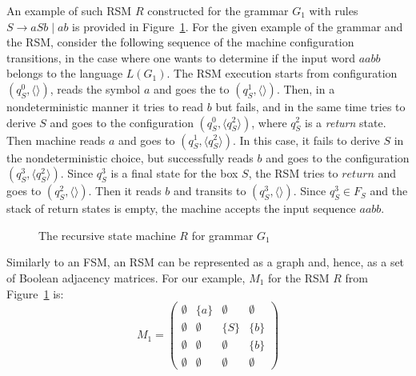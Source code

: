 An example of such RSM $R$ constructed for the grammar $G_1$ with rules $S \to a S b \mid a b$ is provided in Figure~\ref{example:automata}.
For the given example of the grammar and the RSM, consider the following sequence of the machine configuration transitions, in the case where one wants to determine if the input word $aabb$ belongs to the language $L(G_1)$.
The RSM execution starts from configuration $(q_S^0,\langle \rangle)$, reads the symbol $a$ and goes the to $(q_S^1, \langle \rangle)$.
Then, in a nondeterministic manner it tries to read $b$ but fails, and in the same time tries to derive $S$ and goes to the configuration $(q_S^0, \langle q_S^2 \rangle)$, where $q_S^2$ is a \textit{return} state.
Then machine reads $a$ and goes to $(q_S^1, \langle q_S^2 \rangle)$. In this case, it fails to derive $S$ in the nondeterministic choice, but successfully reads $b$ and goes to the configuration $(q_S^3,\langle q_S^2 \rangle)$.
Since $q_S^3$ is a final state for the box $S$, the RSM tries to $return$ and goes to $(q_S^2,\langle \rangle)$.
Then it reads $b$ and transits to $(q_S^3,\langle \rangle)$.
Since $q_S^3 \in F_S$ and the stack of return states is empty, the machine accepts the input sequence $aabb$.
\begin{figure}[h]
    \centering
    \caption{The recursive state machine $R$ for grammar $G_1$}
    \label{example:automata}
\end{figure}


Similarly to an FSM, an RSM can be represented as a graph and, hence, as a set of Boolean adjacency matrices.
For our example, $M_1$ for the RSM $R$ from Figure~\ref{example:automata} is:
    $$
    M_1 =
    \begin{pmatrix}
    \emptyset & \{a\} &   \emptyset &  \emptyset     \\
     \emptyset &  \emptyset & \{S\} & \{b\} \\
     \emptyset &  \emptyset &  \emptyset & \{b\}     \\
     \emptyset &  \emptyset &   \emptyset&   \emptyset
    \end{pmatrix}
    $$


